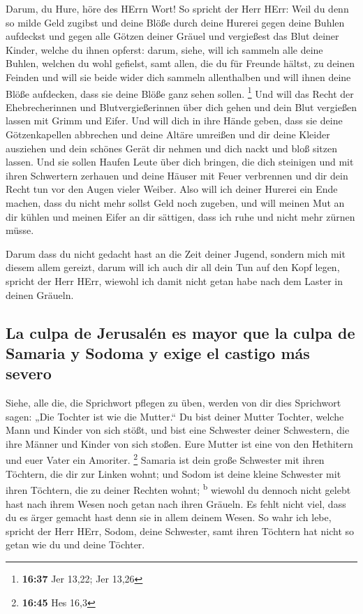  Darum, du Hure, höre des HErrn Wort!  So
spricht der Herr HErr: Weil du denn so milde Geld zugibst und deine
Blöße durch deine Hurerei gegen deine Buhlen aufdeckst und gegen alle
Götzen deiner Gräuel und vergießest das Blut deiner Kinder, welche du
ihnen opferst:  darum, siehe, will ich sammeln alle deine
Buhlen, welchen du wohl gefielst, samt allen, die du für Freunde hältst,
zu deinen Feinden und will sie beide wider dich sammeln allenthalben und
will ihnen deine Blöße aufdecken, dass sie deine Blöße ganz sehen
sollen. \footnote{\textbf{16:37} Jer 13,22; Jer 13,26} 
Und will das Recht der Ehebrecherinnen und Blutvergießerinnen über dich
gehen und dein Blut vergießen lassen mit Grimm und Eifer.
 Und will dich in ihre Hände geben, dass sie deine
Götzenkapellen abbrechen und deine Altäre umreißen und dir deine Kleider
ausziehen und dein schönes Gerät dir nehmen und dich nackt und bloß
sitzen lassen.  Und sie sollen Haufen Leute über dich
bringen, die dich steinigen und mit ihren Schwertern zerhauen
 und deine Häuser mit Feuer verbrennen und dir dein Recht
tun vor den Augen vieler Weiber. Also will ich deiner Hurerei ein Ende
machen, dass du nicht mehr sollst Geld noch zugeben,  und
will meinen Mut an dir kühlen und meinen Eifer an dir sättigen, dass ich
ruhe und nicht mehr zürnen müsse.

 Darum dass du nicht gedacht hast an die Zeit deiner
Jugend, sondern mich mit diesem allem gereizt, darum will ich auch dir
all dein Tun auf den Kopf legen, spricht der Herr HErr, wiewohl ich
damit nicht getan habe nach dem Laster in deinen Gräueln.

\hypertarget{la-culpa-de-jerusaluxe9n-es-mayor-que-la-culpa-de-samaria-y-sodoma-y-exige-el-castigo-muxe1s-severo}{%
\subsection{La culpa de Jerusalén es mayor que la culpa de Samaria y
Sodoma y exige el castigo más
severo}\label{la-culpa-de-jerusaluxe9n-es-mayor-que-la-culpa-de-samaria-y-sodoma-y-exige-el-castigo-muxe1s-severo}}

 Siehe, alle die, die Sprichwort pflegen zu üben, werden
von dir dies Sprichwort sagen: „Die Tochter ist wie die Mutter.``
 Du bist deiner Mutter Tochter, welche Mann und Kinder
von sich stößt, und bist eine Schwester deiner Schwestern, die ihre
Männer und Kinder von sich stoßen. Eure Mutter ist eine von den
Hethitern und euer Vater ein Amoriter. \footnote{\textbf{16:45} Hes 16,3}
 Samaria ist dein große Schwester mit ihren Töchtern, die
dir zur Linken wohnt; und Sodom ist deine kleine Schwester mit ihren
Töchtern, die zu deiner Rechten wohnt; \textsuperscript{b}
 wiewohl du dennoch nicht gelebt hast nach ihrem Wesen
noch getan nach ihren Gräueln. Es fehlt nicht viel, dass du es ärger
gemacht hast denn sie in allem deinem Wesen.  So wahr ich
lebe, spricht der Herr HErr, Sodom, deine Schwester, samt ihren Töchtern
hat nicht so getan wie du und deine Töchter.

